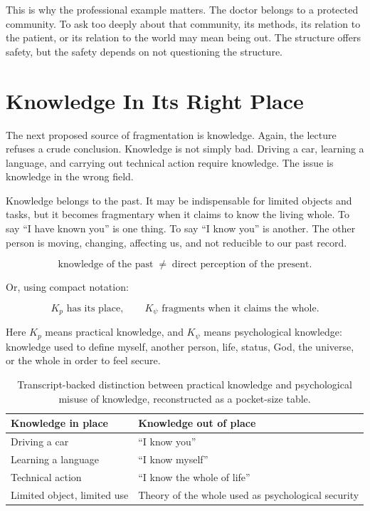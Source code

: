 This is why the professional example matters. The doctor belongs to a protected community. To ask too deeply about that community, its methods, its relation to the patient, or its relation to the world may mean being out. The structure offers safety, but the safety depends on not questioning the structure.

\section{Knowledge In Its Right Place}

The next proposed source of fragmentation is knowledge. Again, the lecture refuses a crude conclusion. Knowledge is not simply bad. Driving a car, learning a language, and carrying out technical action require knowledge. The issue is knowledge in the wrong field.

Knowledge belongs to the past. It may be indispensable for limited objects and tasks, but it becomes fragmentary when it claims to know the living whole. To say ``I have known you'' is one thing. To say ``I know you'' is another. The other person is moving, changing, affecting us, and not reducible to our past record.

\begin{equation}
\text{knowledge of the past}
\;\not=\;
\text{direct perception of the present}.
\end{equation}

Or, using compact notation:

\begin{equation}
K_p \text{ has its place},
\qquad
K_{\psi} \text{ fragments when it claims the whole}.
\end{equation}

Here \(K_p\) means practical knowledge, and \(K_{\psi}\) means psychological knowledge: knowledge used to define myself, another person, life, status, God, the universe, or the whole in order to feel secure.

\begin{table}
\centering
\begin{tabular}{p{.42\linewidth} p{.42\linewidth}}
\hline
Knowledge in place & Knowledge out of place \\
\hline
Driving a car & ``I know you'' \\
Learning a language & ``I know myself'' \\
Technical action & ``I know the whole of life'' \\
Limited object, limited use & Theory of the whole used as psychological security \\
\hline
\end{tabular}
\caption{Transcript-backed distinction between practical knowledge and psychological misuse of knowledge, reconstructed as a pocket-size table.}
\end{table}

